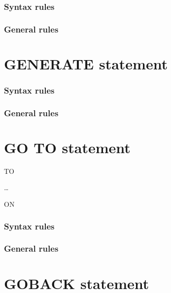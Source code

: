 \subsubsection{Syntax rules}

\subsubsection{General rules}

\section{GENERATE statement}

\begin{syntax}
\end{syntax}

\subsubsection{Syntax rules}

\subsubsection{General rules}

\section{GO TO statement}

\begin{syntax}
   TO
  \begin{1=}
    \procedurename
  \end{1=} \ldots
  \begin{0-1}
     ON \identifier
  \end{0-1}
\end{syntax}

\subsubsection{Syntax rules}

\subsubsection{General rules}

\section{GOBACK statement}

